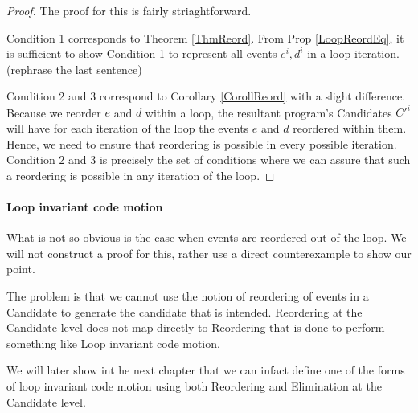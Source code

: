         \begin{proof}
        
            The proof for this is fairly striaghtforward. 

            Condition 1 corresponds to Theorem \ref{ThmReord}. 
            From Prop \ref{LoopReordEq}, it is sufficient to show Condition 1 to represent all events $e^i, d^i$ in a loop iteration. 
            (rephrase the last sentence)

            Condition 2 and 3 correspond to Corollary \ref{CorollReord} with a slight difference. Because we reorder $e$ and $d$ within a loop, the resultant program's Candidates $C'^i$ will have for each iteration of the loop the events $e$ and $d$ reordered within them. 
            Hence, we need to ensure that reordering is possible in every possible iteration. 
            Condition 2 and 3 is precisely the set of conditions where we can assure that such a reordering is possible in any iteration of the loop. 
            

            
        \end{proof}


        \paragraph{Loop invariant code motion}
            What is not so obvious is the case when events are reordered out of the loop. We will not construct a proof for this, rather use a direct counterexample to show our point. 



            The problem is that we cannot use the notion of reordering of events in a Candidate to generate the candidate that is intended. Reordering at the Candidate level does not map directly to Reordering that is done to perform something like Loop invariant code motion. 

            We will later show int he next chapter that we can infact define one of the forms of loop invariant code motion using both Reordering and Elimination at the Candidate level.
             
    